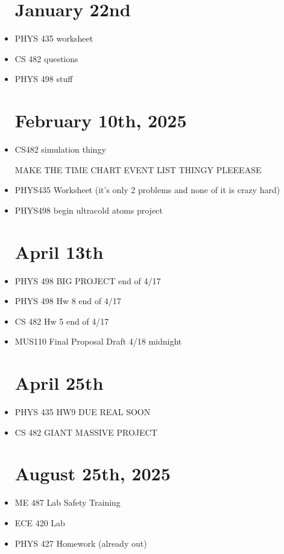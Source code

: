 \documentclass{report}
\begin{document}
\begin{itemize}
\chapter{January 22nd}
\item
PHYS 435 worksheet 
\item 
CS 482 questions 
\item 
PHYS 498 stuff 

\chapter{February 10th, 2025}
\item 
CS482 simulation thingy 

MAKE THE TIME CHART EVENT LIST THINGY PLEEEASE 
\item 
PHYS435 Worksheet (it's only 2 problems and none 
of it is crazy hard)
\item 
PHYS498 begin ultracold atoms project

\chapter{April 13th}
\item 
PHYS 498 BIG PROJECT  end of 4/17
\item 
PHYS 498 Hw 8 end of 4/17
\item 
CS 482 Hw 5 end of 4/17
\item 
MUS110 Final Proposal Draft 4/18 midnight 

\chapter{April 25th}
\item 
PHYS 435 HW9 DUE REAL SOON 
\item 
CS 482 GIANT MASSIVE PROJECT 


\chapter{August 25th, 2025}
\item 
ME 487 Lab Safety Training 
\item 
ECE 420 Lab 
\item 
PHYS 427 Homework (already out)























\end{itemize}
\end{document}
